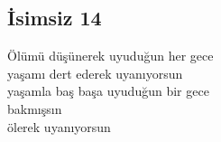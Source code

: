 \subsection{İsimsiz 14}

Ölümü düşünerek uyuduğun her gece \\
yaşamı dert ederek uyanıyorsun \\
yaşamla baş başa uyuduğun bir gece \\
	bakmışsın \\
		ölerek uyanıyorsun